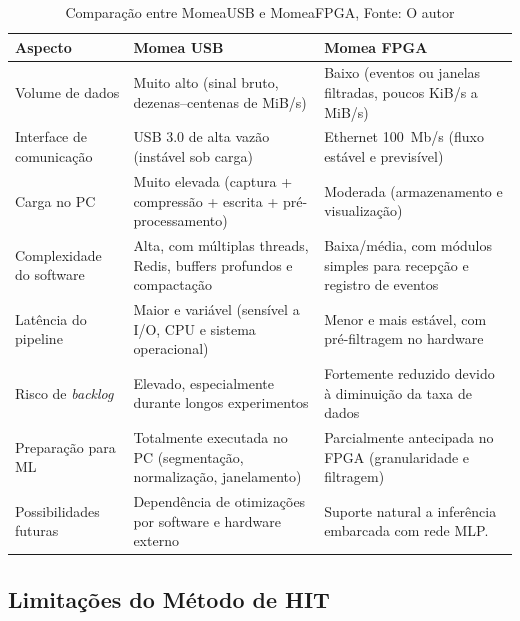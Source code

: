 \begin{table}[H]
	\caption{Comparação entre MomeaUSB e MomeaFPGA, Fonte: O autor}
	\label{tab:ComparacaoMomeaUSB_FPGA}
	\centering
	\footnotesize
	\renewcommand{\arraystretch}{1.35}
	\begin{tabular}{p{4cm} p{5.5cm} p{5.5cm}}
		\toprule
		\textbf{Aspecto} & \textbf{Momea USB} & \textbf{Momea FPGA} \\
		\midrule
		
		Volume de dados & Muito alto (sinal bruto, dezenas--centenas de MiB/s) 
		& Baixo (eventos ou janelas filtradas, poucos KiB/s a MiB/s) \\
		
		Interface de comunicação & USB 3.0 de alta vazão (instável sob carga) 
		& Ethernet 100~Mb/s (fluxo estável e previsível) \\
		
		Carga no PC & Muito elevada (captura + compressão + escrita + pré-processamento)
		& Moderada (armazenamento e visualização) \\
		
		Complexidade do software & Alta, com múltiplas threads, Redis, buffers profundos e compactação 
		& Baixa/média, com módulos simples para recepção e registro de eventos \\
		
		Latência do pipeline & Maior e variável (sensível a I/O, CPU e sistema operacional)
		& Menor e mais estável, com pré-filtragem no hardware \\
		
		Risco de \textit{backlog} & Elevado, especialmente durante longos experimentos 
		& Fortemente reduzido devido à diminuição da taxa de dados \\
		
		Preparação para ML & Totalmente executada no PC (segmentação, normalização, janelamento)
		& Parcialmente antecipada no FPGA (granularidade e filtragem) \\
		
		Possibilidades futuras & Dependência de otimizações por software e hardware externo 
		& Suporte natural a inferência embarcada com rede MLP. \\
		\bottomrule
	\end{tabular}
\end{table}


\subsection{Limitações do Método de HIT}

